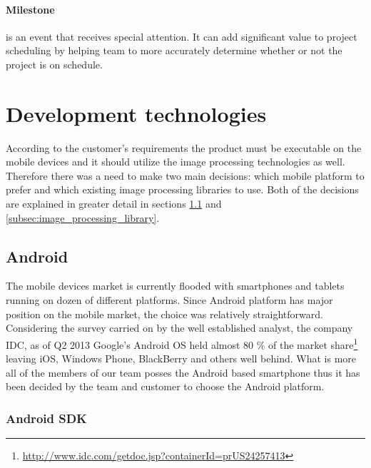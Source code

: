 \paragraph{Milestone} is an event that receives special attention. It can add significant value to project scheduling by helping team to more accurately determine whether or not the project is on schedule.


\section{Development technologies} \label{sec:development_technologies}

According to the customer's requirements the product must be executable on the mobile devices and it should utilize the image processing technologies as well. 
Therefore there was a need to make two main decisions: which mobile platform to prefer and which existing image processing libraries to use. 
Both of the decisions are explained in greater detail in sections \ref{subsec:mobile_platform} and \ref{subsec:image_processing_library}.


\subsection{Android} \label{subsec:mobile_platform}

The mobile devices market is currently flooded with smartphones and tablets running on dozen of different platforms. 
Since Android platform has major position on the mobile market, the choice was relatively straightforward.
Considering the survey carried on by the well established analyst, the company IDC, as of Q2 2013 Google's Android OS held almost 80 \% of the market share\footnote{\url{http://www.idc.com/getdoc.jsp?containerId=prUS24257413}} leaving iOS, Windows Phone, BlackBerry and others well behind.
What is more all of the members of our team posses the Android based smartphone thus it has been decided by the team and customer to choose the Android platform.

\subsubsection{Android SDK}

